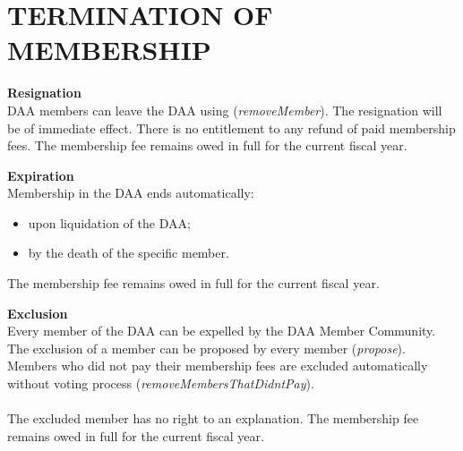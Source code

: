 \section{TERMINATION OF MEMBERSHIP}\label{sec:termination-of-membership}

\item \textbf{Resignation} \\
DAA members can leave the DAA using (\emph{removeMember}).
The resignation will be of immediate effect.
There is no entitlement to any refund of paid membership fees.
The membership fee remains owed in full for the current fiscal year.

\item \textbf{Expiration} \\
Membership in the DAA ends automatically:
\begin{itemize}
    \item upon liquidation of the DAA;
    \item by the death of the specific member.
\end{itemize}
The membership fee remains owed in full for the current fiscal year.

\item \textbf{Exclusion} \\
Every member of the DAA can be expelled by the DAA Member Community.
The exclusion of a member can be proposed by every member (\emph{propose}). %
Members who did not pay their membership fees are excluded automatically without voting process (\emph{removeMembersThatDidntPay}). \\ \\
The excluded member has no right to an explanation.
The membership fee remains owed in full for the current fiscal year.
